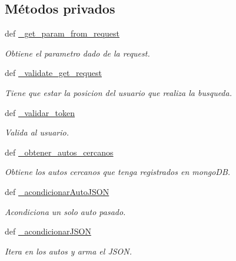 \subsection*{Métodos privados}
\begin{DoxyCompactItemize}
\item 
def \hyperlink{classsrc_1_1resources_1_1autos_por_posicion_cercana_1_1_autos_por_posicion_cercana_a651a21fe70cdb11ccb7ecddf3a2ef71e}{\-\_\-get\-\_\-param\-\_\-from\-\_\-request}
\begin{DoxyCompactList}\small\item\em Obtiene el parametro dado de la request. \end{DoxyCompactList}\item 
def \hyperlink{classsrc_1_1resources_1_1autos_por_posicion_cercana_1_1_autos_por_posicion_cercana_af31560b90a07c4caf7dcd7f729a97473}{\-\_\-validate\-\_\-get\-\_\-request}
\begin{DoxyCompactList}\small\item\em Tiene que estar la posicion del usuario que realiza la busqueda. \end{DoxyCompactList}\item 
def \hyperlink{classsrc_1_1resources_1_1autos_por_posicion_cercana_1_1_autos_por_posicion_cercana_a071a3bedc7dabbdcfa7a3a2c72ccfb04}{\-\_\-validar\-\_\-token}
\begin{DoxyCompactList}\small\item\em Valida al usuario. \end{DoxyCompactList}\item 
def \hyperlink{classsrc_1_1resources_1_1autos_por_posicion_cercana_1_1_autos_por_posicion_cercana_ae2a7c1697a8d0b5e263a8178f3ad9352}{\-\_\-obtener\-\_\-autos\-\_\-cercanos}
\begin{DoxyCompactList}\small\item\em Obtiene los autos cercanos que tenga registrados en mongo\-D\-B. \end{DoxyCompactList}\item 
def \hyperlink{classsrc_1_1resources_1_1autos_por_posicion_cercana_1_1_autos_por_posicion_cercana_a087e0b7b45211aff9925ce9fdcd368bc}{\-\_\-acondicionar\-Auto\-J\-S\-O\-N}
\begin{DoxyCompactList}\small\item\em Acondiciona un solo auto pasado. \end{DoxyCompactList}\item 
def \hyperlink{classsrc_1_1resources_1_1autos_por_posicion_cercana_1_1_autos_por_posicion_cercana_aa2d6fe08fd52d4fd16b9d6c1831a0d2b}{\-\_\-acondicionar\-J\-S\-O\-N}
\begin{DoxyCompactList}\small\item\em Itera en los autos y arma el J\-S\-O\-N. \end{DoxyCompactList}\end{DoxyCompactItemize}


